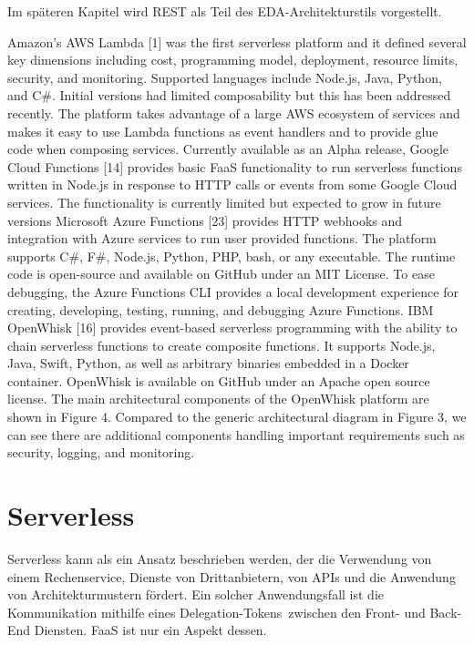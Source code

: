 \documentclass[
12pt,
english,
ngerman,
headsepline,
twoside,
openright,
numbers=noenddot,version=first
]{scrreprt}
\begin{document}
Im späteren Kapitel wird REST als Teil des \acrshort{EDA}-Architekturstils vorgestellt.

Amazon’s AWS Lambda [1] was the first serverless platform and it defined several
key dimensions including cost, programming model, deployment, resource limits,
security, and monitoring. Supported languages include Node.js, Java, Python, and
C\#. Initial versions had limited composability but this has been addressed recently.
The platform takes advantage of a large AWS ecosystem of services and makes
it easy to use Lambda functions as event handlers and to provide glue code when
composing services.
Currently available as an Alpha release, Google Cloud Functions [14] provides
basic FaaS functionality to run serverless functions written in Node.js in response
to HTTP calls or events from some Google Cloud services. The functionality is
currently limited but expected to grow in future versions
Microsoft Azure Functions [23] provides HTTP webhooks and integration with
Azure services to run user provided functions. The platform supports C\#, F\#,
Node.js, Python, PHP, bash, or any executable. The runtime code is open-source
and available on GitHub under an MIT License. To ease debugging, the Azure Functions
CLI provides a local development experience for creating, developing, testing,
running, and debugging Azure Functions.
IBM OpenWhisk [16] provides event-based serverless programming with the
ability to chain serverless functions to create composite functions. It supports
Node.js, Java, Swift, Python, as well as arbitrary binaries embedded in a Docker
container. OpenWhisk is available on GitHub under an Apache open source license.
The main architectural components of the OpenWhisk platform are shown in Figure
4. Compared to the generic architectural diagram in Figure 3, we can see there
are additional components handling important requirements such as security, logging,
and monitoring.



\section{Serverless}
\label{sec:serverless}

Serverless kann als ein Ansatz beschrieben werden, der die Verwendung von einem Rechenservice, Dienste von Drittanbietern, von \acrfull{API}s und die Anwendung von Architekturmustern fördert. Ein solcher Anwendungsfall ist die Kommunikation mithilfe eines \glqq Delegation-Tokens\grqq\ zwischen den Front- und Back-End Diensten. \acrshort{FaaS} ist nur ein Aspekt dessen.
\end{document}
